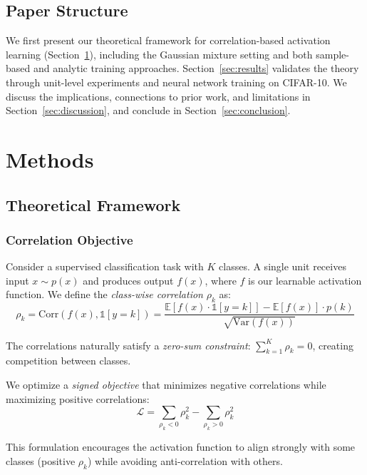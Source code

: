 \documentclass{article}
\begin{document}
\subsection{Paper Structure}

We first present our theoretical framework for correlation-based activation learning (Section~\ref{sec:methods}), including the Gaussian mixture setting and both sample-based and analytic training approaches. Section~\ref{sec:results} validates the theory through unit-level experiments and neural network training on CIFAR-10. We discuss the implications, connections to prior work, and limitations in Section~\ref{sec:discussion}, and conclude in Section~\ref{sec:conclusion}.

\section{Methods}
\label{sec:methods}

\subsection{Theoretical Framework}

\subsubsection{Correlation Objective}

Consider a supervised classification task with $K$ classes. A single unit receives input $x \sim p(x)$ and produces output $f(x)$, where $f$ is our learnable activation function. We define the \emph{class-wise correlation} $\rho_k$ as:
\begin{equation}
\rho_k = \text{Corr}(f(x), \mathbb{1}[y=k]) = \frac{\mathbb{E}[f(x) \cdot \mathbb{1}[y=k]] - \mathbb{E}[f(x)] \cdot p(k)}{\sqrt{\text{Var}(f(x))}}
\end{equation}

The correlations naturally satisfy a \emph{zero-sum constraint}: $\sum_{k=1}^K \rho_k = 0$, creating competition between classes.

We optimize a \emph{signed objective} that minimizes negative correlations while maximizing positive correlations:
\begin{equation}
\mathcal{L} = \sum_{\rho_k < 0} \rho_k^2 - \sum_{\rho_k > 0} \rho_k^2
\label{eq:signed_objective}
\end{equation}

This formulation encourages the activation function to align strongly with some classes (positive $\rho_k$) while avoiding anti-correlation with others.
\end{document}
